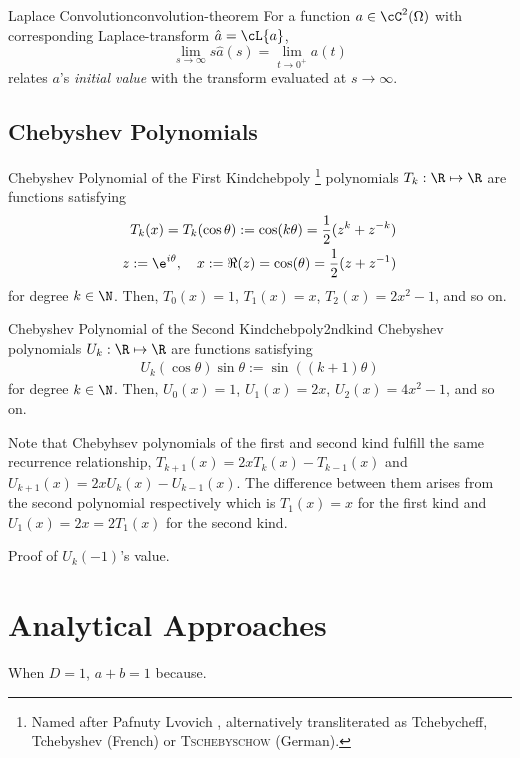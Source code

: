 \documentclass{prettytex/ox/mmsc-special-topic}
\begin{document}
  \begin{theorem}{Laplace Convolution}{convolution-theorem}
    For a function $a \in \cC^2(\Omega)$ with corresponding Laplace-transform $\hat{a} = \cL\{a\}$,
    $$\lim_{s \rightarrow \infty} s \hat{a}(s) = \lim_{t \rightarrow 0^+} a(t)$$
    relates $a$'s \textit{initial value} with the transform evaluated at $s \rightarrow \infty$.
  \end{theorem}

  \subsection{Chebyshev Polynomials}
  \begin{definition}{Chebyshev Polynomial of the First Kind}{chebpoly}
    \chebyshev\footnote{Named after Pafnuty Lvovich \chebyshev, alternatively transliterated as Tchebycheff, Tchebyshev (French) or \textsc{Tschebyschow} (German).} polynomials $T_k: \R \mapsto \R$ are functions satisfying
    \begin{align*}
      T_k(x) = T_k(\cos \theta) := \cos(k \theta) = \frac{1}{2} (z^k + z^{-k}) \\
      z := \e^{i \theta},\quad x := \Re(z) = \cos(\theta) = \frac{1}{2}(z + z^{-1})
    \end{align*}
    for degree $k \in \N$. Then, $T_0(x) = 1$, $T_1(x) = x$, $T_2(x) = 2x^2-1$, and so on.
  \end{definition}

  \begin{definition}{Chebyshev Polynomial of the Second Kind}{chebpoly2ndkind}
    Chebyshev polynomials $U_k: \R \mapsto \R$ are functions satisfying
    \begin{align*}
      U_k(\cos \theta) \sin \theta := \sin\left((k+1) \theta\right)
    \end{align*}
    for degree $k \in \N$. Then, $U_0(x) = 1$, $U_1(x) = 2x$, $U_2(x) = 4x^2-1$, and so on.
  \end{definition}
  Note that Chebyhsev polynomials of the first and second kind fulfill the same recurrence relationship, $T_{k+1}(x) = 2x T_k(x) - T_{k-1}(x)$ and $U_{k+1}(x) = 2x U_k(x) - U_{k-1}(x)$. The difference between them arises from the second polynomial respectively which is $T_1(x)=x$ for the first kind and $U_1(x) = 2x = 2 T_1(x)$ for the second kind.

  Proof of $U_k(-1)$'s value.

  \section{Analytical Approaches}
  When $D = 1$, $a + b = 1$ because. %
\end{document}
